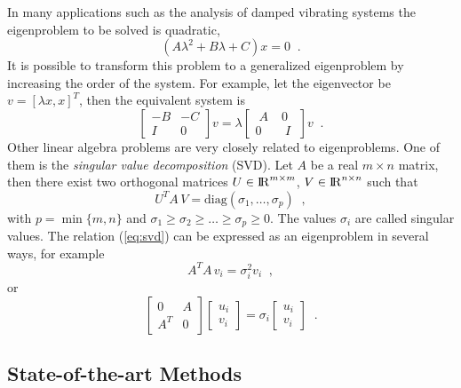 	In many applications such as the analysis of damped vibrating systems the eigenproblem to be solved is quadratic,
\begin{equation}(A\lambda^2+B\lambda+C)x=0\;\;.\label{eq:eigcuad}\end{equation}
It is possible to transform this problem to a generalized eigenproblem by increasing the order of the system. For example, let the eigenvector be $v=[\lambda x, x]^T$, then the equivalent system is
\begin{equation}
\label{eq:quad}
\left[\begin{array}{cc}-B & -C\\I & 0\end{array}\right]v=\lambda\left[\begin{array}{cc}\;A\; & 0\\0 & \;I\;\end{array}\right]v\;\;.
\end{equation}
	Other linear algebra problems are very closely related to eigenproblems. One of them is the {\em singular value decomposition\/} (SVD). Let $A$ be a real $m\times n$ matrix, then there exist two orthogonal matrices $U\in{\rm I\!R}^{m\times m}$, $V\in{\rm I\!R}^{n\times n}$ such that
\begin{equation}
\label{eq:svd}
U^T\!A\,V=\mathrm{diag}(\sigma_1,\ldots,\sigma_p)\;\;,
\end{equation}
with $p=\min\{m,n\}$ and $\sigma_1\geq\sigma_2\geq\ldots\geq\sigma_p\geq 0$. The values $\sigma_i$ are called singular values. The relation (\ref{eq:svd}) can be expressed as an eigenproblem in several ways, for example
\begin{equation}
\label{eq:svdata}
A^T\!A\,v_i=\sigma_i^2v_i\;\;,
\end{equation}
or
\begin{equation}
\label{eq:svd2}
\left[\begin{array}{cc}0&A\\A^T&0\end{array}\right]
\left[\begin{array}{c}u_i\\v_i\end{array}\right]=\sigma_i
\left[\begin{array}{c}u_i\\v_i\end{array}\right]\;\;.
\end{equation}

\subsection{State-of-the-art Methods}

